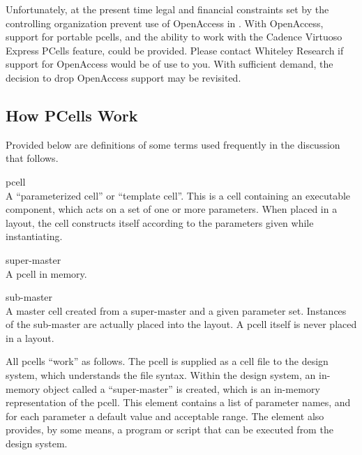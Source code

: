 Unfortunately, at the present time legal and financial constraints set
by the controlling organization prevent use of OpenAccess in {\Xic}. 
With OpenAccess, support for portable pcells, and the ability to work
with the Cadence Virtuoso Express PCells feature, could be provided. 
Please contact Whiteley Research if support for OpenAccess would be of
use to you.  With sufficient demand, the decision to drop OpenAccess
support may be revisited.
\fi

\subsection{How PCells Work}

Provided below are definitions of some terms used frequently in the
discussion that follows.
\begin{description}
\item{\et pcell}\\
A ``parameterized cell'' or ``template cell''.  This is a cell
containing an executable component, which acts on a set of one or more
parameters.  When placed in a layout, the cell constructs itself
according to the parameters given while instantiating.

\item{\et super-master}\\
A {\et pcell} in memory.

\item{\et sub-master}\\
A master cell created from a {\et super-master} and a given parameter
set.  Instances of the sub-master are actually placed into the layout. 
A {\et pcell} itself is never placed in a layout.
\end{description}

All pcells ``work'' as follows.  The pcell is supplied as a cell file
to the design system, which understands the file syntax.  Within the
design system, an in-memory object called a ``super-master'' is
created, which is an in-memory representation of the pcell.  This
element contains a list of parameter names, and for each parameter a
default value and acceptable range.  The element also provides, by
some means, a program or script that can be executed from the design
system.

